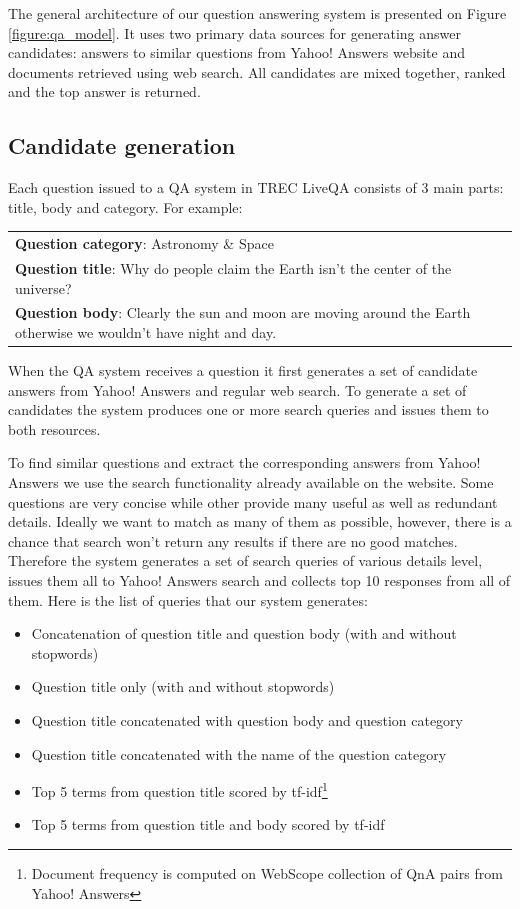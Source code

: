 \documentclass[]{article}
\begin{document}
The general architecture of our question answering system is presented on Figure \ref{figure:qa_model}.
It uses two primary data sources for generating answer candidates: answers to similar questions from Yahoo! Answers website and documents retrieved using web search. 
All candidates are mixed together, ranked and the top answer is returned.

\subsection{Candidate generation}
 
Each question issued to a QA system in TREC LiveQA consists of 3 main parts: title, body and category.
For example:

\vspace{0.3cm}
\begin{tabular}{|p{15cm}|}
\hline
\textbf{Question category}: Astronomy \& Space\\
\textbf{Question title}: Why do people claim the Earth isn't the center of the universe?\\
\textbf{Question body}: Clearly the sun and moon are moving around the Earth otherwise we wouldn't have night and day.\\
\hline
\end{tabular}
\vspace{0.3cm}

When the QA system receives a question it first generates a set of candidate answers from Yahoo! Answers and regular web search.
To generate a set of candidates the system produces one or more search queries and issues them to both resources.

To find similar questions and extract the corresponding answers from Yahoo! Answers we use the search functionality already available on the website.
Some questions are very concise while other provide many useful as well as redundant details.
Ideally we want to match as many of them as possible, however, there is a chance that search won't return any results if there are no good matches.
Therefore the system generates a set of search queries of various details level, issues them all to Yahoo! Answers search and collects top 10 responses from all of them.
Here is the list of queries that our system generates:
\begin{itemize}
	\setlength\itemsep{0mm}
	\item Concatenation of question title and question body (with and without stopwords)
	\item Question title only (with and without stopwords)
	\item Question title concatenated with question body and question category
	\item Question title concatenated with the name of the question category
	\item Top 5 terms from question title scored by tf-idf\footnote{Document frequency is computed on WebScope collection of QnA pairs from Yahoo! Answers}
	\item Top 5 terms from question title and body scored by tf-idf
\end{itemize}
\end{document}
